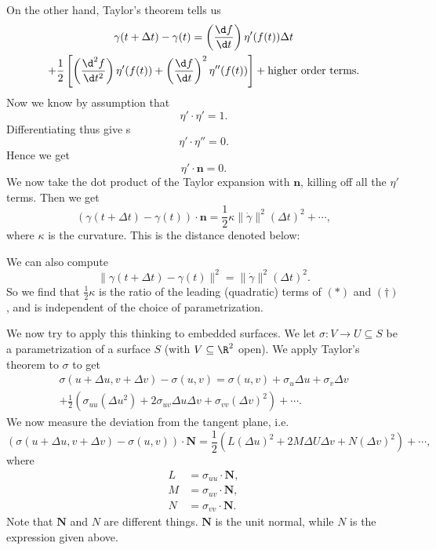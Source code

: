\documentclass[a4paper]{article}
\begin{document}
On the other hand, Taylor's theorem tells us
\begin{multline*}
  \gamma(t + \Delta t) - \gamma(t) = \left(\frac{\d f}{\d t}\right) \eta'(f(t)) \Delta t \\
  + \frac{1}{2} \left[\left(\frac{\d^2 f}{\d t^2}\right) \eta'(f(t)) + \left(\frac{\d f}{\d t}\right)^2 \eta''(f(t))\right] + \text{higher order terms}.
\end{multline*}
Now we know by assumption that
\[
  \eta' \cdot \eta' = 1.
\]
Differentiating thus give
s\[
  \eta' \cdot \eta'' = 0.
\]
Hence we get
\[
  \eta' \cdot \mathbf{n} = 0.
\]
We now take the dot product of the Taylor expansion with $\mathbf{n}$, killing off all the $\eta'$ terms. Then we get
\[
  (\gamma(t + \Delta t) - \gamma(t)) \cdot \mathbf{n} = \frac{1}{2} \kappa \|\dot{\gamma}\|^2 (\Delta t)^2 + \cdots,\tag{$*$}
\]
where $\kappa$ is the curvature. This is the distance denoted below:
\begin{center}
\end{center}
We can also compute
\[
  \|\gamma(t + \Delta t) - \gamma(t)\|^2 = \|\dot{\gamma}\|^2 (\Delta t)^2.\tag{$\dagger$}
\]
So we find that $\frac{1}{2}\kappa$ is the ratio of the leading (quadratic) terms of $(*)$ and $(\dagger)$, and is independent of the choice of parametrization.

We now try to apply this thinking to embedded surfaces. We let $\sigma: V \to U \subseteq S$ be a parametrization of a surface $S$ (with $V \subseteq \R^2$ open). We apply Taylor's theorem to $\sigma$ to get
\begin{multline*}
  \sigma(u + \Delta u, v + \Delta v) - \sigma(u, v) = \sigma(u, v) + \sigma_u \Delta u + \sigma_v \Delta v \\
  + \frac{1}{2}(\sigma_{uu} (\Delta u^2) + 2 \sigma_{uv} \Delta u \Delta v + \sigma_{vv} (\Delta v)^2) + \cdots.
\end{multline*}
We now measure the deviation from the tangent plane, i.e.
\[
  (\sigma(u + \Delta u, v + \Delta v) - \sigma(u, v))\cdot \mathbf{N} = \frac{1}{2}(L(\Delta u)^2 + 2M\Delta U \Delta v + N (\Delta v)^2) + \cdots,
\]
where
\begin{align*}
  L &= \sigma_{uu} \cdot \mathbf{N},\\
  M &= \sigma_{uv} \cdot \mathbf{N},\\
  N &= \sigma_{vv} \cdot \mathbf{N}.
\end{align*}
Note that $\mathbf{N}$ and $N$ are different things. $\mathbf{N}$ is the unit normal, while $N$ is the expression given above.
\end{document}
